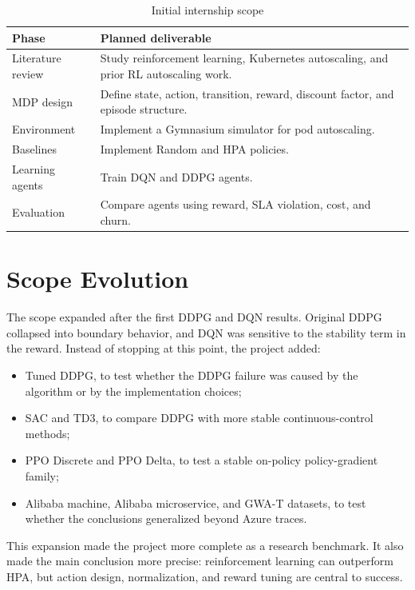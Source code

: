 \documentclass{rapportINPTCLOUD}
\begin{document}
\begin{table}[H]
\centering
\begin{tabularx}{\textwidth}{lY}
\toprule
\textbf{Phase} & \textbf{Planned deliverable} \\
\midrule
Literature review & Study reinforcement learning, Kubernetes autoscaling, and prior RL autoscaling work. \\
MDP design & Define state, action, transition, reward, discount factor, and episode structure. \\
Environment & Implement a Gymnasium simulator for pod autoscaling. \\
Baselines & Implement Random and HPA policies. \\
Learning agents & Train DQN and DDPG agents. \\
Evaluation & Compare agents using reward, SLA violation, cost, and churn. \\
\bottomrule
\end{tabularx}
\caption{Initial internship scope}
\end{table}

\section{Scope Evolution}

The scope expanded after the first DDPG and DQN results. Original DDPG collapsed into boundary behavior, and DQN was sensitive to the stability term in the reward. Instead of stopping at this point, the project added:

\begin{itemize}
  \item Tuned DDPG, to test whether the DDPG failure was caused by the algorithm or by the implementation choices;
  \item SAC and TD3, to compare DDPG with more stable continuous-control methods;
  \item PPO Discrete and PPO Delta, to test a stable on-policy policy-gradient family;
  \item Alibaba machine, Alibaba microservice, and GWA-T datasets, to test whether the conclusions generalized beyond Azure traces.
\end{itemize}

This expansion made the project more complete as a research benchmark. It also made the main conclusion more precise: reinforcement learning can outperform HPA, but action design, normalization, and reward tuning are central to success.
\end{document}

